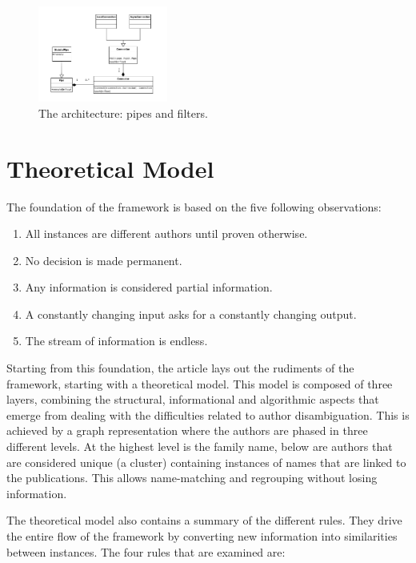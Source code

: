 \documentclass[9pt, twocolumn]{phdsymp} %
\begin{document}
\begin{figure}[h!]
	\centering
	\includegraphics[width= 0.38\textwidth]{fig/architecturev2.pdf}
	\caption{The architecture: pipes and filters.}
	\label{fig:arch}
\end{figure}

\section{Theoretical Model}

The foundation of the framework is based on the five following observations:

\begin{enumerate}
	\item All instances are different authors until proven otherwise.
	\item No decision is made permanent.
	\item Any information is considered partial information.
	\item A constantly changing input asks for a constantly changing output.
	\item The stream of information is endless.
\end{enumerate}

Starting from this foundation, the article lays out the rudiments of the framework, starting with a theoretical model. This model is composed of three layers, combining the structural, informational and algorithmic aspects that emerge from dealing with the difficulties related to author disambiguation. This is achieved by a graph representation where the authors are phased in three different levels. At the highest level is the family name, below are authors that are considered unique (a cluster) containing instances of names that are linked to the publications. This allows name-matching and regrouping without losing information.

The theoretical model also contains a summary of the different rules. They drive the entire flow of the framework by converting new information into similarities between instances. The four rules that are examined are:
\end{document}

